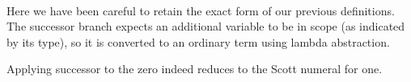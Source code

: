 \begin{fence}
\begin{code}
\AgdaSpace{}%
\AgdaSymbol{(}\AgdaSpace{}%
\AgdaOperator{\AgdaInductiveConstructor{,}}\AgdaSpace{}%
\AgdaSpace{}%
\AgdaSpace{}%
\AgdaSymbol{)}%
\>[48]\AgdaSpace{}%
\AgdaSymbol{(}\AgdaSpace{}%
\AgdaSpace{}%
\AgdaSymbol{)}\<%
\\
\>[0]\AgdaSpace{}%
\AgdaSpace{}%
\AgdaSpace{}%
\AgdaSpace{}%
\AgdaSymbol{=}\AgdaSpace{}%
\AgdaSpace{}%
\AgdaSpace{}%
\AgdaSymbol{(}\AgdaSpace{}%
\AgdaSymbol{)}\AgdaSpace{}%
\AgdaSpace{}%
\<%
\end{code}
\end{fence}

Here we have been careful to retain the exact form of our previous
definitions. The successor branch expects an additional variable to be
in scope (as indicated by its type), so it is converted to an ordinary
term using lambda abstraction.

Applying successor to the zero indeed reduces to the Scott numeral for
one.

